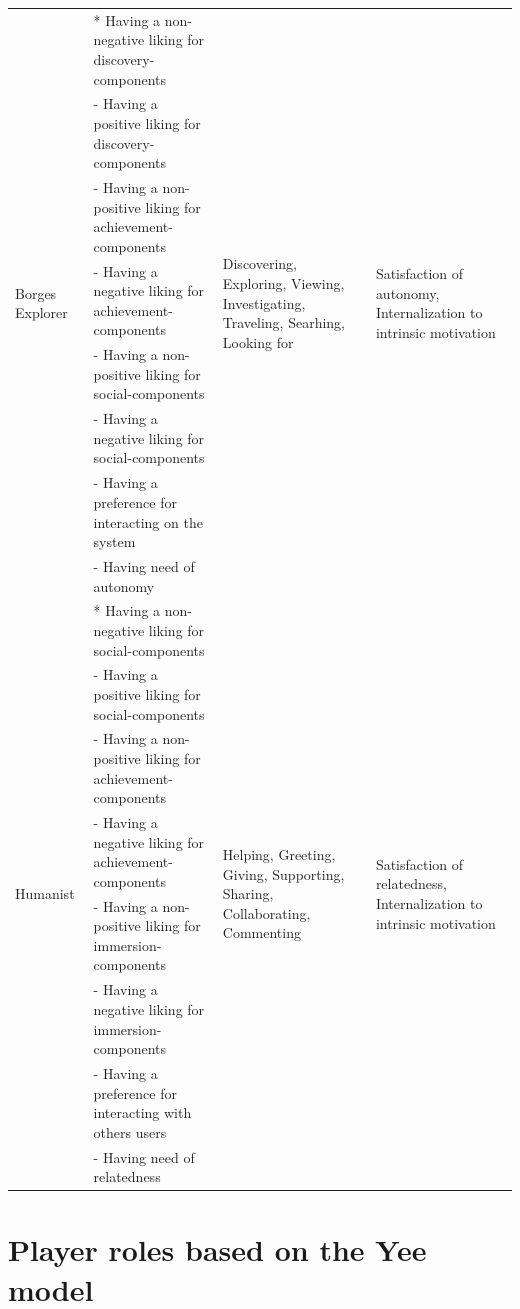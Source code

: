 \begin{quadro}[htb]
\begin{tabular}{|p{2cm}|l|p{2.5cm}|p{2.5cm}|}
\multirow{8}{2cm}{Borges Explorer} &
* Having a non-negative liking for discovery-components &
\multirow{8}{2.5cm}{Discovering, Exploring, Viewing, Investigating, Traveling, Searhing, Looking for} &
\multirow{8}{2.5cm}{Satisfaction of autonomy, Internalization to intrinsic motivation} \\
 & - Having a positive liking for discovery-components & & \\
 & - Having a non-positive liking for achievement-components & & \\
 & - Having a negative liking for achievement-components & & \\
 & - Having a non-positive liking for social-components & & \\
 & - Having a negative liking for social-components & & \\
 & - Having a preference for interacting on the system & & \\
 & - Having need of autonomy & & \\
\hline

\multirow{8}{2cm}{Humanist} &
* Having a non-negative liking for social-components &
\multirow{8}{2.5cm}{Helping, Greeting, Giving, Supporting, Sharing, Collaborating, Commenting} &
\multirow{8}{2.5cm}{Satisfaction of relatedness, Internalization to intrinsic motivation} \\
 & - Having a positive liking for social-components & & \\
 & - Having a non-positive liking for achievement-components & & \\
 & - Having a negative liking for achievement-components & & \\
 & - Having a non-positive liking for immersion-components & & \\
 & - Having a negative liking for immersion-components & & \\
 & - Having a preference for interacting with others users & & \\
 & - Having need of relatedness & & \\
\hline

\end{tabular} 

\end{quadro} \newpage


\section{Player roles based on the Yee model}
\label{sec:player-roles-based-yee}

